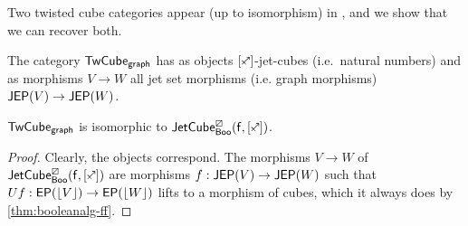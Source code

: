 \documentclass[a4paper]{memoir}
\begin{document}
Two twisted cube categories appear (up to isomorphism) in \cite{pinyo-twisted}, and we show that we can recover both.

\begin{definition} \cite[def.\ 25]{pinyo-twisted}
	The category ${\mathsf{TwCube}}_{\mathsf{graph}}$ has as objects $[\ypolar]$-jet-cubes (i.e.\ natural numbers) and as morphisms $V \to W$ all jet set morphisms (i.e. graph morphisms) $\mathsf{JEP}(V) \to \mathsf{JEP}(W)$.
\end{definition}
\begin{proposition}
	 ${\mathsf{TwCube}}_{\mathsf{graph}}$ is isomorphic to $\jetcubefwd \cartes \booleanalg {[\ypolar]}$.
\end{proposition}
\begin{proof}
	Clearly, the objects correspond.
	The morphisms $V \to W$ of $\jetcubefwd \cartes \booleanalg {[\ypolar]}$ are morphisms $f : \mathsf{JEP}(V) \to \mathsf{JEP}(W)$ such that $Uf : \mathsf{EP}(\mathopen{}\left\lfloor V \right\rfloor\mathclose{}) \to \mathsf{EP}(\mathopen{}\left\lfloor W \right\rfloor\mathclose{})$ lifts to a morphism of cubes, which it always does by \cref{thm:booleanalg-ff}.
\end{proof}
\end{document}
